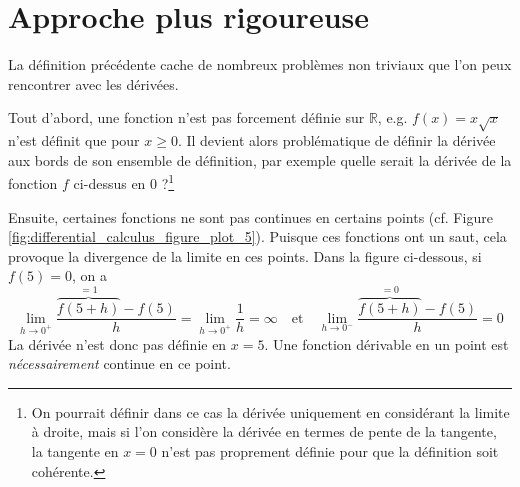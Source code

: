     
    


\section{Approche plus rigoureuse}
La définition précédente cache de nombreux problèmes non triviaux que l'on peux rencontrer avec les dérivées. 

Tout d'abord, une fonction n'est pas forcement définie sur $\mathbb{R}$, e.g. $f(x) = x \sqrt{x}$ n'est définit que pour $x \geq 0$. Il devient alors problématique de définir la dérivée aux bords de son ensemble de définition, par exemple quelle serait la dérivée de la fonction $f$ ci-dessus en $0$ ?\footnote{On pourrait définir dans ce cas la dérivée uniquement en considérant la limite à droite, mais si l'on considère la dérivée en termes de pente de la tangente, la tangente en $x = 0$ n'est pas proprement définie pour que la définition soit cohérente.}

Ensuite, certaines fonctions ne sont pas continues en certains points (cf. Figure \ref{fig:differential_calculus_figure_plot_5}). Puisque ces fonctions ont un saut, cela provoque la divergence de la limite en ces points. Dans la figure ci-dessous, si $f(5) = 0$, on a
\begin{equation}
\lim_{h \to 0^+} \frac{\overbrace{f(5+h)}^{=1}-f(5)}{h} = \lim_{h \to 0^+} \frac{1}{h} = \infty \quad \textrm{et} \quad \lim_{h \to 0^-} \frac{\overbrace{f(5+h)}^{=0}-f(5)}{h} = 0
\end{equation}
La dérivée n'est donc pas définie en $x = 5$. Une fonction dérivable en un point est \emph{nécessairement} continue en ce point.

